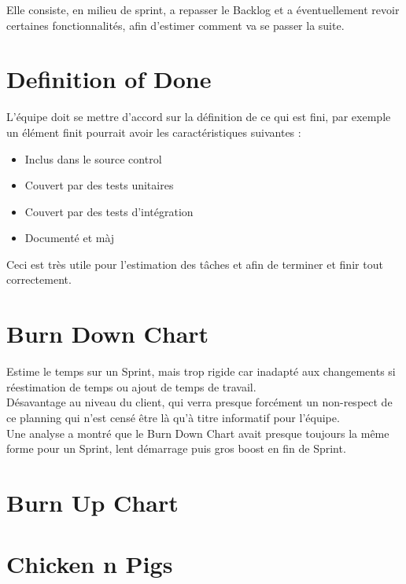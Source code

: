 \documentclass{report}
\begin{document}
			Elle consiste, en milieu de sprint, a repasser le Backlog et a éventuellement revoir certaines fonctionnalités, afin d'estimer comment va se passer la suite.\\

	\section{Definition of Done}

		L'équipe doit se mettre d'accord sur la définition de ce qui est fini, par exemple un élément finit pourrait avoir les caractéristiques suivantes : \\

		\begin{itemize}
			\item Inclus dans le source control
			\item Couvert par des tests unitaires
			\item Couvert par des tests d'intégration
			\item Documenté et màj\\
		\end{itemize}

		Ceci est très utile pour l'estimation des tâches et afin de terminer et finir tout correctement.\\

	\section{Burn Down Chart}

		Estime le temps sur un Sprint, mais trop rigide car inadapté aux changements si réestimation de temps ou ajout de temps de travail.\\

		Désavantage au niveau du client, qui verra presque forcément un non-respect de ce planning qui n'est censé être là qu'à titre informatif pour l'équipe.\\

		Une analyse a montré que le Burn Down Chart avait presque toujours la même forme pour un Sprint, lent démarrage puis gros boost en fin de Sprint.\\

	\section{Burn Up Chart}

	\section{Chicken n Pigs}
\end{document}
